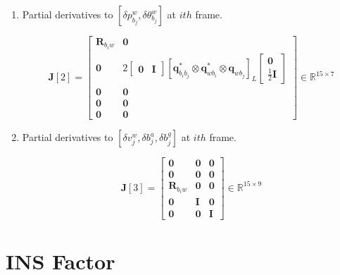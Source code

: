 \documentclass[12pt]{report}   %
\begin{document}
\begin{enumerate}
	\item Partial derivatives to {\color{blue}$[\delta p^{w}_{b_{j}},\delta \theta ^{w}_{b_{j}}]$} at $ith$ frame.
	
	\begin{equation}
	\mathbf{J}[2]=
	\begin{bmatrix}
	\mathbf{R}_{b_{i} w} & \mathbf{0} \\
	\mathbf{0} & 2\left[\begin{array}{ll}{\mathbf{0}} & {\mathbf{I}}\end{array}\right]\left[\mathbf{q}_{b_{i} b_{j}}^{*} \otimes \mathbf{q}_{w b_{i}}^{*} \otimes \mathbf{q}_{w b_{j}}\right]_{L}\left[\begin{array}{c}{\mathbf{0}} \\ {\frac{1}{2} \mathbf{I}}\end{array}\right] \\
	\mathbf{0} & \mathbf{0} \\
	\mathbf{0} & \mathbf{0}  \\
	\mathbf{0} & \mathbf{0}   
	\end{bmatrix}
	\in \mathbb{R}^{15 \times 7}
	\end{equation}
	
	\item Partial derivatives to {\color{blue}$[\delta v^{w}_{j},\delta b^a_{j},\delta b^g_{j}]$} at $ith$ frame.
	
	\begin{equation}
	\mathbf{J}[3]=
	\begin{bmatrix}
	\mathbf{0} & \mathbf{0} & \mathbf{0} \\
	\mathbf{0} & \mathbf{0} & \mathbf{0} \\
	\mathbf{R}_{b_{i} w} & \mathbf{0} & \mathbf{0} \\
	\mathbf{0} & \mathbf{I} & \mathbf{0} \\
	\mathbf{0} & \mathbf{0} & \mathbf{I}
	\end{bmatrix}
	\in \mathbb{R}^{15 \times 9}
	\end{equation}
	
\end{enumerate}



\section{INS Factor}
\end{document}
